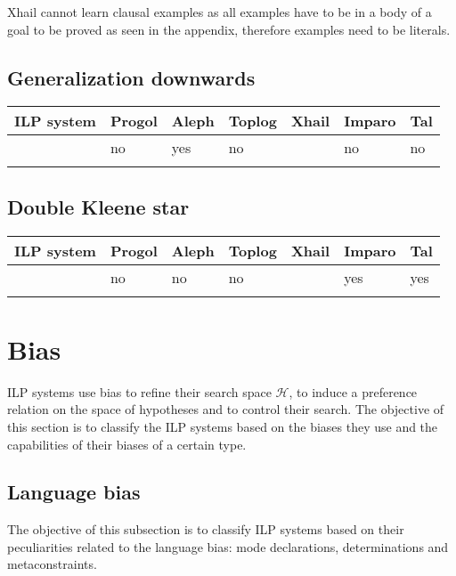 Xhail cannot learn clausal examples as all examples have to be in a body of a goal to be proved as seen in the appendix, therefore examples need to be literals.

\subsection{Generalization downwards}
\begin{center}
 \label{tab:title} 
\begin{tabular}{| l | l | l | l | l | l | l |}
    \hline
    ILP system & Progol & Aleph & Toplog & Xhail & Imparo & Tal \\ \hline
    & no & yes & no &  & no & no \\ \hline
    & & & & & & \\ \hline
\end{tabular}
\end{center}

\subsection{Double Kleene star}
\begin{center}
 \label{tab:title} 
\begin{tabular}{| l | l | l | l | l | l | l |}
    \hline
    ILP system & Progol & Aleph & Toplog & Xhail & Imparo & Tal \\ \hline
    & no & no & no & & yes & yes \\ \hline
    & & & & & & \\ \hline
\end{tabular}
\end{center}

\section{Bias}
ILP systems use bias to refine their search space $\mathcal{H}$, to induce a preference relation on the space of hypotheses and to control their search. The objective of this section is to classify the ILP systems based on the biases they use and the capabilities of their biases of a certain type.

\subsection{Language bias}\label{subsec:classification_language_bias}
The objective of this subsection is to classify ILP systems based on their peculiarities related to the language bias: mode declarations, determinations and metaconstraints.

